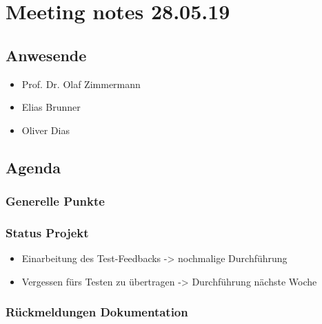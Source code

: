 \hypertarget{meeting-notes-280519}{%
\section*{Meeting notes 28.05.19}\label{meeting-notes-280519}}

\hypertarget{anwesende}{%
\subsection*{Anwesende}\label{anwesende}}

\begin{itemize}
\item
  Prof. Dr. Olaf Zimmermann
\item
  Elias Brunner
\item
  Oliver Dias
\end{itemize}

\hypertarget{agenda}{%
\subsection*{Agenda}\label{agenda}}

\hypertarget{generelle-punkte}{%
\subsubsection*{Generelle Punkte}\label{generelle-punkte}}

\hypertarget{status-projekt}{%
\subsubsection*{Status Projekt}\label{status-projekt}}

\begin{itemize}
\item
  Einarbeitung des Test-Feedbacks -\textgreater{} nochmalige
  Durchführung
\item
  Vergessen fürs Testen zu übertragen -\textgreater{} Durchführung
  nächste Woche
\end{itemize}

\hypertarget{ruxfcckmeldungen-dokumentation}{%
\subsubsection*{Rückmeldungen
Dokumentation}\label{ruxfcckmeldungen-dokumentation}}

